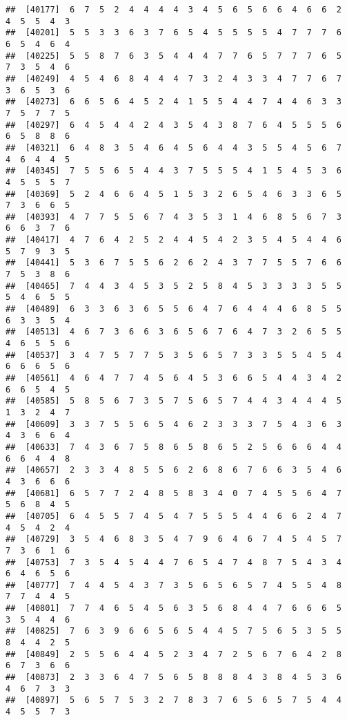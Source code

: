 \documentclass[
]{book}
\begin{document}
\begin{verbatim}
##  [40177]  6  7  5  2  4  4  4  4  3  4  5  6  5  6  6  4  6  6  2  4  5  5  4  3
##  [40201]  5  5  3  3  6  3  7  6  5  4  5  5  5  5  4  7  7  7  6  6  5  4  6  4
##  [40225]  5  5  8  7  6  3  5  4  4  4  7  7  6  5  7  7  7  6  5  7  3  5  4  6
##  [40249]  4  5  4  6  8  4  4  4  7  3  2  4  3  3  4  7  7  6  7  3  6  5  3  6
##  [40273]  6  6  5  6  4  5  2  4  1  5  5  4  4  7  4  4  6  3  3  7  5  7  7  5
##  [40297]  6  4  5  4  4  2  4  3  5  4  3  8  7  6  4  5  5  5  6  6  5  8  8  6
##  [40321]  6  4  8  3  5  4  6  4  5  6  4  4  3  5  5  4  5  6  7  4  6  4  4  5
##  [40345]  7  5  5  6  5  4  4  3  7  5  5  5  4  1  5  4  5  3  6  4  5  5  5  7
##  [40369]  5  2  4  6  6  4  5  1  5  3  2  6  5  4  6  3  3  6  5  7  3  6  6  5
##  [40393]  4  7  7  5  5  6  7  4  3  5  3  1  4  6  8  5  6  7  3  6  6  3  7  6
##  [40417]  4  7  6  4  2  5  2  4  4  5  4  2  3  5  4  5  4  4  6  5  7  9  3  5
##  [40441]  5  3  6  7  5  5  6  2  6  2  4  3  7  7  5  5  7  6  6  7  5  3  8  6
##  [40465]  7  4  4  3  4  5  3  5  2  5  8  4  5  3  3  3  3  5  5  5  4  6  5  5
##  [40489]  6  3  3  6  3  6  5  5  6  4  7  6  4  4  4  6  8  5  5  6  3  3  5  4
##  [40513]  4  6  7  3  6  6  3  6  5  6  7  6  4  7  3  2  6  5  5  4  6  5  5  6
##  [40537]  3  4  7  5  7  7  5  3  5  6  5  7  3  3  5  5  4  5  4  6  6  6  5  6
##  [40561]  4  6  4  7  7  4  5  6  4  5  3  6  6  5  4  4  3  4  2  6  6  5  4  5
##  [40585]  5  8  5  6  7  3  5  7  5  6  5  7  4  4  3  4  4  4  5  1  3  2  4  7
##  [40609]  3  3  7  5  5  6  5  4  6  2  3  3  3  7  5  4  3  6  3  4  3  6  6  4
##  [40633]  7  4  3  6  7  5  8  6  5  8  6  5  2  5  6  6  6  4  4  6  6  4  4  8
##  [40657]  2  3  3  4  8  5  5  6  2  6  8  6  7  6  6  3  5  4  6  4  3  6  6  6
##  [40681]  6  5  7  7  2  4  8  5  8  3  4  0  7  4  5  5  6  4  7  5  6  8  4  5
##  [40705]  6  4  5  5  7  4  5  4  7  5  5  5  4  4  6  6  2  4  7  4  5  4  2  4
##  [40729]  3  5  4  6  8  3  5  4  7  9  6  4  6  7  4  5  4  5  7  7  3  6  1  6
##  [40753]  7  3  5  4  5  4  4  7  6  5  4  7  4  8  7  5  4  3  4  6  4  6  5  6
##  [40777]  7  4  4  5  4  3  7  3  5  6  5  6  5  7  4  5  5  4  8  7  7  4  4  5
##  [40801]  7  7  4  6  5  4  5  6  3  5  6  8  4  4  7  6  6  6  5  3  5  4  4  6
##  [40825]  7  6  3  9  6  6  5  6  5  4  4  5  7  5  6  5  3  5  5  8  4  4  2  5
##  [40849]  2  5  5  6  4  4  5  2  3  4  7  2  5  6  7  6  4  2  8  6  7  3  6  6
##  [40873]  2  3  3  6  4  7  5  6  5  8  8  8  4  3  8  4  5  3  6  4  6  7  3  3
##  [40897]  5  6  5  7  5  3  2  7  8  3  7  6  5  6  5  7  5  4  4  4  5  5  7  3

\end{verbatim}
\end{document}
